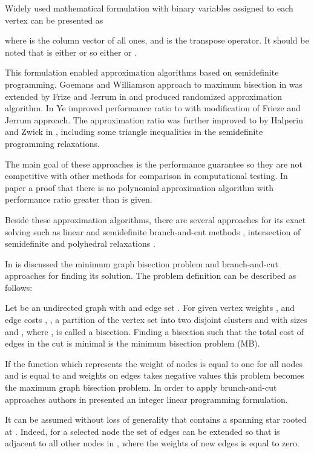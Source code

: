 \documentclass[10pt]{article}
\begin{document}
Widely used mathematical formulation with binary variables  assigned to each vertex can be presented as 



where  is the column vector of all ones, and  is the transpose operator. It should be noted
that  is either  or  so either  or . 

This formulation enabled
approximation algorithms based on semidefinite programming. 
Goemans and Williamson approach to maximum bisection in \cite{goemans} was extended by 
Frize and Jerrum in \cite{frieze}
and produced randomized  approximation algorithm. In \cite{ye} Ye improved performance ratio to 
with modification of Frieze and Jerrum approach. 
The approximation ratio was further improved to  by 
Halperin and Zwick in \cite{zwick}, including some triangle inequalities in the
semidefinite programming relaxations.

The main goal of these approaches is the performance guarantee so they are not competitive
with other methods for comparison in computational testing.
In paper \cite{hastad} a proof that there is no polynomial approximation algorithm with performance ratio
greater than  is given.  

Beside these approximation algorithms, there are several approaches for its exact solving such as 
linear and semidefinite
branch-and-cut methods \cite{armb},
intersection of semidefinite and  polyhedral relaxations \cite{rendl}.

In \cite{armb} is discussed  the minimum graph bisection problem and branch-and-cut approaches
for finding its solution. The problem definition can be described as follows:


Let  be an undirected graph with  and 
edge set . For given vertex weights , and edge costs , , a partition of the vertex set  into two disjoint clusters 
and  with sizes  and , 
where ,
is called a bisection. Finding a bisection such that the total cost of edges in the
cut  is minimal is the minimum bisection
problem (MB). 

If the function  which represents the weight of nodes is equal to one for all nodes
and  is equal to  and weights on edges  takes negative values
this problem becomes the maximum graph bisection problem. In order to apply brunch-and-cut 
approaches authors in \cite{armb} presented an integer linear programming formulation.


It can be assumed without loss of generality that  contains a spanning star rooted at . Indeed, for a selected node  the set of edges can be extended so that  is adjacent to all other nodes in , where the weights  of new edges is equal to zero. 
\end{document}
